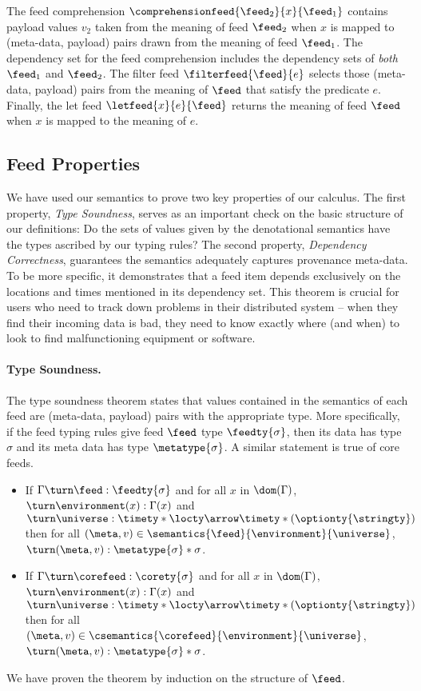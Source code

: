 The feed comprehension $\comprehensionfeed{\feed_2}{x}{\feed_1}$
contains payload values $v_2$ taken from the meaning of feed $\feed_2$
when $x$ is mapped to (meta-data, payload) pairs drawn from the meaning
of feed $\feed_1$.  The dependency set for the feed
comprehension includes the dependency sets of {\em both} $\feed_1$ and
$\feed_2$. 
The filter feed $\filterfeed{\feed}{e}$ selects those
(meta-data, payload) pairs from 
the meaning of $\feed$  that satisfy the predicate $e$.
Finally, the let feed $\letfeed{x}{e}{\feed}$ returns the meaning
of feed $\feed$ when $x$ is mapped to the meaning of $e$. 

\subsection{Feed Properties}
We have used our semantics to prove two key properties of our calculus.
The first property, {\em Type Soundness}, serves as an important check
on the basic structure of our definitions:  Do the sets of values given
by the denotational semantics have the types ascribed by our typing rules?
The second property, {\em Dependency Correctness}, guarantees the semantics
adequately captures provenance meta-data.  To be more specific, it demonstrates
that a feed item depends exclusively on the locations and times mentioned
in its dependency set.  This theorem is crucial for users who need to
track down problems in their distributed system -- when they find their
incoming data is bad, they need to know exactly where (and when) to look 
to find malfunctioning equipment or software.

\paragraph*{Type Soundness.}
The type soundness theorem states that values
contained in the semantics of each feed are (meta-data, payload) pairs
with the appropriate type.  More specifically, if the feed typing
rules give feed $\feed$ type $\feedty{\sigma}$, 
then its data has type $\sigma$ and its meta data has type $\metatype{\sigma}$.
A similar statement is true of core feeds.

\begin{theorem}
\begin{itemize}
\item If $\Gamma \turn \feed : \feedty{\sigma}$ and
for all $x$ in $\dom(\Gamma)$, $\turn \environment(x) : \Gamma(x)$
and $\turn \universe : \timety * \locty \arrow \timety * (\optionty{\stringty})$
then
for all $(\meta,v) \in \semantics{\feed}{\environment}{\universe}$,
$\turn (\meta,v) : \metatype{\sigma} * \sigma$. 
\item If $\Gamma \turn \corefeed : \corety{\sigma}$ and
for all $x$ in $\dom(\Gamma)$, $\turn \environment(x) : \Gamma(x)$
and $\turn \universe : \timety * \locty \arrow \timety * (\optionty{\stringty})$
then
for all $(\meta,v) \in \csemantics{\corefeed}{\environment}{\universe}$,
$\turn (\meta,v) : \metatype{\sigma} * \sigma$. 
\end{itemize}
\end{theorem}
\noindent
We have proven the theorem by induction on the structure of $\feed$.

